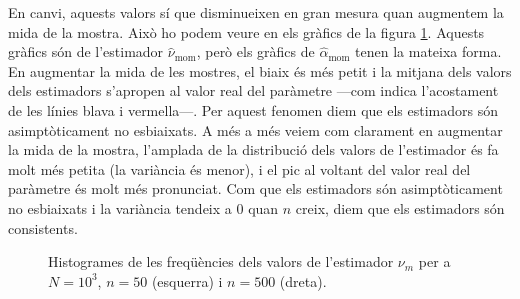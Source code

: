 \documentclass[12pt, catalan]{article}
\numberwithin{table}{section}
\numberwithin{figure}{section}
\numberwithin{equation}{section}
\begin{document}
En canvi, aquests valors sí que disminueixen en gran mesura quan augmentem la mida de la mostra. Això ho podem veure en els gràfics de la figura \ref{comparar}. Aquests gràfics són de l'estimador $\hat{\nu}_\text{mom}$, però els gràfics de $\hat{\alpha}_\text{mom}$ tenen la mateixa forma. En augmentar la mida de les mostres, el biaix és més petit i la mitjana dels valors dels estimadors s'apropen al valor real del paràmetre ---com indica l'acostament de les línies blava i vermella---. Per aquest fenomen diem que els estimadors són asimptòticament no esbiaixats. A més a més veiem com clarament en augmentar la mida de la mostra, l'amplada de la distribució dels valors de l'estimador és fa molt més petita (la variància és menor), i el pic al voltant del valor real del paràmetre és molt més pronunciat. Com que els estimadors són asimptòticament no esbiaixats i la variància tendeix a 0 quan $n$ creix, diem que els estimadors són consistents.
\begin{figure}[!ht]
     \hfill
     \caption{Histogrames de les freqüències dels valors de l'estimador $\nu_m$ per a $N=10^3$, $n=50$ (esquerra) i $n=500$ (dreta).}
     \label{comparar}
  \end{figure}
\end{document}
